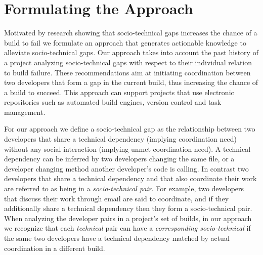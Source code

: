 \documentclass[conference]{IEEEtran}
\begin{document}


%
%
%

\section{Formulating the Approach}
Motivated by research showing that socio-technical gaps increases the chance of a build to fail we formulate an approach that generates actionable knowledge to alleviate socio-technical gaps.
Our approach takes into account the past history of a project analyzing socio-technical gaps with respect to their individual relation to build failure.
These recommendations aim at initiating coordination between two developers that form a gap in the current build, thus increasing the chance of a build to succeed.
This approach can support projects that use electronic repositories such as automated build engines, version control and task management.

For our approach we define a socio-technical gap as the relationship between two developers that share a technical dependency (implying coordination need) without any social interaction (implying unmet coordination need).
A technical dependency can be inferred by two developers changing the same file, or a developer changing method another developer's code is calling.
In contrast two developers that share a technical dependency and that also coordinate their work are referred to as being in a \emph{socio-technical pair}.
For example, two developers that discuss their work through email are said to coordinate, and if they additionally share a technical dependency then they form a socio-technical pair.
%
When analyzing the developer pairs in a project's set of builds, in our approach we recognize that each \emph{technical} pair can have a \emph{corresponding socio-technical} if the same two developers have a technical dependency matched by actual coordination in a different build. 
\end{document}
